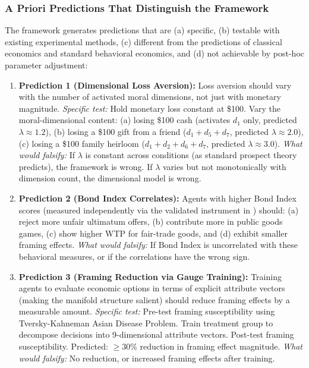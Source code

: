 \documentclass[12pt]{article}
\theoremstyle{definition}
\theoremstyle{remark}
\begin{document}
\subsubsection{A Priori Predictions That Distinguish the Framework}

The framework generates predictions that are (a) specific, (b) testable with existing experimental methods, (c) different from the predictions of classical economics and standard behavioral economics, and (d) not achievable by post-hoc parameter adjustment:

\begin{enumerate}
    \item \textbf{Prediction 1 (Dimensional Loss Aversion):}  Loss aversion should vary with the number of activated moral dimensions, not just with monetary magnitude.  \emph{Specific test:} Hold monetary loss constant at \$100.  Vary the moral-dimensional content: (a) losing \$100 cash (activates $d_1$ only, predicted $\lambda \approx 1.2$), (b) losing a \$100 gift from a friend ($d_1 + d_5 + d_7$, predicted $\lambda \approx 2.0$), (c) losing a \$100 family heirloom ($d_1 + d_2 + d_6 + d_7$, predicted $\lambda \approx 3.0$).  \emph{What would falsify:} If $\lambda$ is constant across conditions (as standard prospect theory predicts), the framework is wrong.  If $\lambda$ varies but not monotonically with dimension count, the dimensional model is wrong.

    \item \textbf{Prediction 2 (Bond Index Correlates):}  Agents with higher Bond Index scores (measured independently via the validated instrument in \cite{bond2026geometric}) should: (a) reject more unfair ultimatum offers, (b) contribute more in public goods games, (c) show higher WTP for fair-trade goods, and (d) exhibit smaller framing effects.  \emph{What would falsify:} If Bond Index is uncorrelated with these behavioral measures, or if the correlations have the wrong sign.

    \item \textbf{Prediction 3 (Framing Reduction via Gauge Training):}  Training agents to evaluate economic options in terms of explicit attribute vectors (making the manifold structure salient) should reduce framing effects by a measurable amount.  \emph{Specific test:} Pre-test framing susceptibility using Tversky-Kahneman Asian Disease Problem.  Train treatment group to decompose decisions into 9-dimensional attribute vectors.  Post-test framing susceptibility.  Predicted: $\geq 30\%$ reduction in framing effect magnitude.  \emph{What would falsify:} No reduction, or increased framing effects after training.


\end{enumerate}
\end{document}
